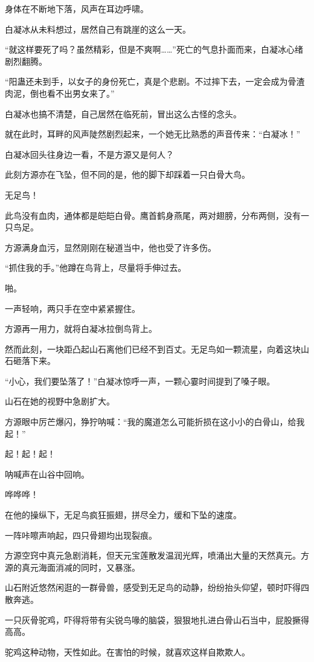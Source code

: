 \begin{this_body}
身体在不断地下落，风声在耳边呼啸。

白凝冰从未料想过，居然自己有跳崖的这么一天。

“就这样要死了吗？虽然精彩，但是不爽啊……”死亡的气息扑面而来，白凝冰心绪剧烈翻腾。

“阳蛊还未到手，以女子的身份死亡，真是个悲剧。不过摔下去，一定会成为骨渣肉泥，倒也看不出男女来了。”

白凝冰也搞不清楚，自己居然在临死前，冒出这么古怪的念头。

就在此时，耳畔的风声陡然剧烈起来，一个她无比熟悉的声音传来：“白凝冰！”

白凝冰回头往身边一看，不是方源又是何人？

此刻方源亦在飞坠，但不同的是，他的脚下却踩着一只白骨大鸟。

无足鸟！

此鸟没有血肉，通体都是皑皑白骨。鹰首鹤身燕尾，两对翅膀，分布两侧，没有一只鸟足。

方源满身血污，显然刚刚在秘道当中，他也受了许多伤。

“抓住我的手。”他蹲在鸟背上，尽量将手伸过去。

啪。

一声轻响，两只手在空中紧紧握住。

方源再一用力，就将白凝冰拉倒鸟背上。

然而此刻，一块距凸起山石离他们已经不到百丈。无足鸟如一颗流星，向着这块山石砸落下来。

“小心，我们要坠落了！”白凝冰惊呼一声，一颗心霎时间提到了嗓子眼。

山石在她的视野中急剧扩大。

方源眼中厉芒爆闪，狰狞呐喊：“我的魔道怎么可能折损在这小小的白骨山，给我起！”

起！起！起！

呐喊声在山谷中回响。

哗哗哗！

在他的操纵下，无足鸟疯狂振翅，拼尽全力，缓和下坠的速度。

一阵咔嚓声响起，四只骨翅均出现裂痕。

方源空窍中真元急剧消耗，但天元宝莲散发温润光辉，喷涌出大量的天然真元。方源的真元海面消减的同时，又暴涨。

山石附近悠然闲逛的一群骨兽，感受到无足鸟的动静，纷纷抬头仰望，顿时吓得四散奔逃。

一只灰骨驼鸡，吓得将带有尖锐鸟喙的脑袋，狠狠地扎进白骨山石当中，屁股撅得高高。

驼鸡这种动物，天性如此。在害怕的时候，就喜欢这样自欺欺人。


\end{this_body}
